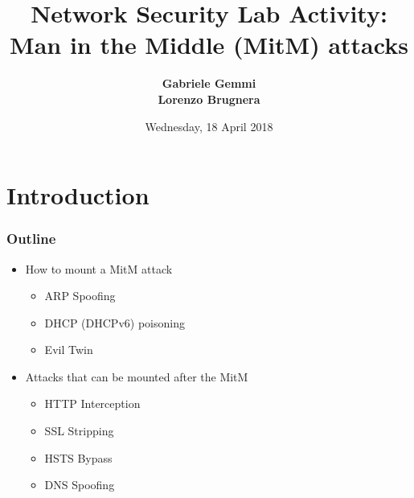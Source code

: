 \documentclass{beamer}
\title[ MitM attacks]{Network Security Lab Activity:\\  Man in the Middle (MitM) attacks}
\author[G. Gemmi, L. Brugnera]{\textbf{Gabriele Gemmi \\ Lorenzo Brugnera}}
\institute[]{
  University of Trento}
\date[18/04/2018]{
 Wednesday, 18 April 2018}
\begin{document}
\begin{frame}
  \titlepage
\end{frame}

%

\section{Introduction}

\begin{frame}
  \frametitle{Outline}
  \begin{itemize}
    \item How to mount a MitM attack
    \begin{itemize}
      \item ARP Spoofing
      \item DHCP (DHCPv6) poisoning
      \item Evil Twin
    \end{itemize}
    \item Attacks that can be mounted after the MitM
    \begin{itemize}
      \item HTTP Interception
      \item SSL Stripping
      \item HSTS Bypass
      \item DNS Spoofing
    \end{itemize}
  \end{itemize}


\end{frame}
\end{document}
